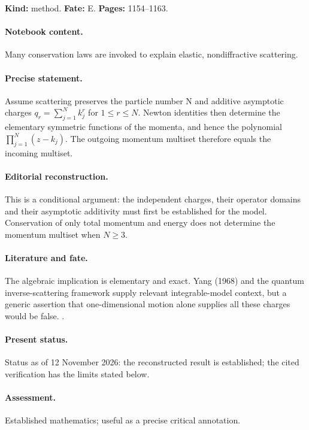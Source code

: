 \label{item:1983-618.11}

\noindent\textbf{Kind:} method. \textbf{Fate:} E. \textbf{Pages:} 1154--1163.\par

\paragraph{Notebook content.} Many conservation laws are invoked to explain elastic, nondiffractive scattering.

\paragraph{Precise statement.} Assume scattering preserves the particle number N and additive asymptotic charges $q_r=\sum_{j=1}^N k_j^r$ for $1\leq r\leq N$. Newton identities then determine the elementary symmetric functions of the momenta, and hence the polynomial $\prod_{j=1}^N(z-k_j)$. The outgoing momentum multiset therefore equals the incoming multiset.

\paragraph{Editorial reconstruction.} This is a conditional argument: the independent charges, their operator domains and their asymptotic additivity must first be established for the model. Conservation of only total momentum and energy does not determine the momentum multiset when $N\geq3$.

\paragraph{Literature and fate.} The algebraic implication is elementary and exact. Yang (1968) and the quantum inverse-scattering framework supply relevant integrable-model context, but a generic assertion that one-dimensional motion alone supplies all these charges would be false. \citep{yang1968smatrix,sklyaninfaddeev1978quantum}.

\paragraph{Present status.} Status as of 12 November 2026: the reconstructed result is established; the cited verification has the limits stated below.

\paragraph{Assessment.} Established mathematics; useful as a precise critical annotation.

